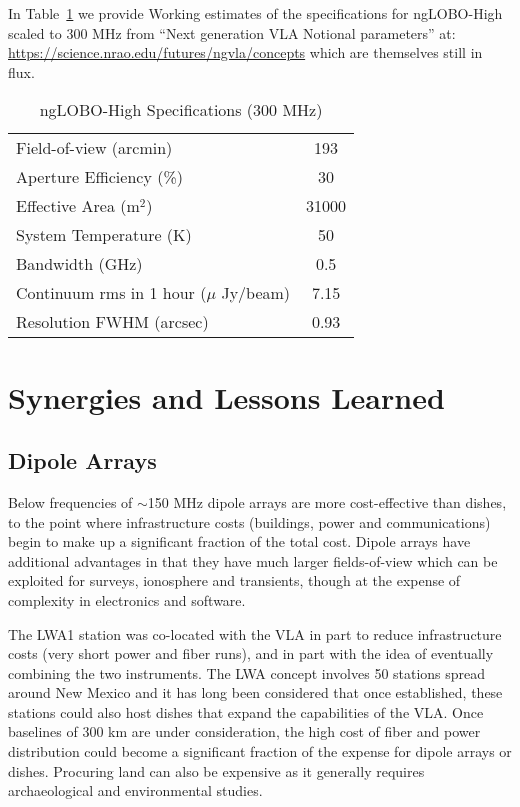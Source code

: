 \documentclass[11pt]{article}
\begin{document}
In Table~\ref{tabSPECShi} we provide Working estimates of the specifications for ngLOBO-High scaled to 300 MHz from ``Next generation VLA Notional parameters'' at:
\url{https://science.nrao.edu/futures/ngvla/concepts} which are themselves still in flux. 

\begin{table}
\begin{center}
\caption{ngLOBO-High Specifications (300 MHz)}\label{tabSPECShi}
\vspace{0.2cm}
\begin{tabular}{lc}
\hline
\hline
Field-of-view (arcmin) & 193\\
Aperture Efficiency (\%) & 30\\
Effective Area (m$^2$) & 31000 \\
System Temperature (K) & 50 \\
Bandwidth (GHz) & 0.5\\
Continuum rms in 1 hour ($\mu$ Jy/beam) & 7.15\\
Resolution FWHM (arcsec) & 0.93\\
\hline
\end{tabular}
\end{center}
\end{table}

\vspace{-0.5cm}
\section{Synergies and Lessons Learned}
\vspace{-0.25cm}

\subsection{Dipole Arrays}

Below frequencies of $\sim$150 MHz dipole arrays are more
cost-effective than dishes, to the point where infrastructure costs
(buildings, power and communications) begin to make up a significant
fraction of the total cost. Dipole arrays have additional advantages in
that they have much larger fields-of-view which can be exploited for
surveys, ionosphere and transients, though at the expense of
complexity in electronics and software.

The LWA1 station was co-located with the VLA in part to reduce
infrastructure costs (very short power and fiber runs), and in
part with the idea of eventually combining the two instruments.
The LWA concept involves 50 stations spread around New Mexico
and it has long been considered that once established, these 
stations could also host dishes that expand the capabilities of
the VLA.  Once baselines of 300 km are under consideration, the
high cost of fiber and power distribution could become a significant
fraction of the expense for dipole arrays or dishes.  Procuring 
land can also be expensive as it generally requires archaeological
and environmental studies.  
\end{document}

